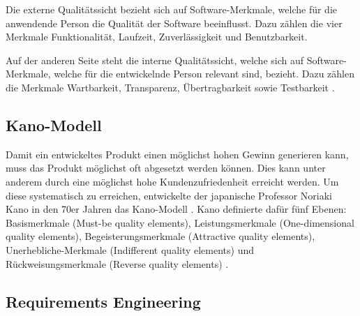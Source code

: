 Die externe Qualitätssicht bezieht sich auf Software-Merkmale, welche für die anwendende Person die Qualität der Software beeinflusst.
Dazu zählen die vier Merkmale Funktionalität, Laufzeit, Zuverlässigkeit und Benutzbarkeit.

Auf der anderen Seite steht die interne Qualitätssicht, welche sich auf Software-Merkmale, welche für die entwickelnde Person relevant sind, bezieht.
Dazu zählen die Merkmale Wartbarkeit, Transparenz, Übertragbarkeit sowie Testbarkeit \autocite[vgl.][S. 6-10]{hoffmann_software-qualitat_2013}.

\subsection{Kano-Modell}
Damit ein entwickeltes Produkt einen möglichst hohen Gewinn generieren kann, muss das Produkt möglichst oft abgesetzt werden können.
Dies kann unter anderem durch eine möglichst hohe Kundenzufriedenheit erreicht werden.
Um diese systematisch zu erreichen, entwickelte der japanische Professor Noriaki Kano in den 70er Jahren das Kano-Modell \autocite[vgl.][S. 27]{sauerwein_kano-modell_2000}.
Kano definierte dafür fünf Ebenen: 
Basismerkmale (Must-be quality elements), Leistungsmerkmale (One-dimensional quality elements), Begeisterungsmerkmale (Attractive quality elements), Unerhebliche-Merkmale (Indifferent quality elements) und Rückweisungsmerkmale (Reverse quality elements) \autocite[vgl.][S. 82-83]{holzing_kano-theorie_2008}.

\subsection{Requirements Engineering}
